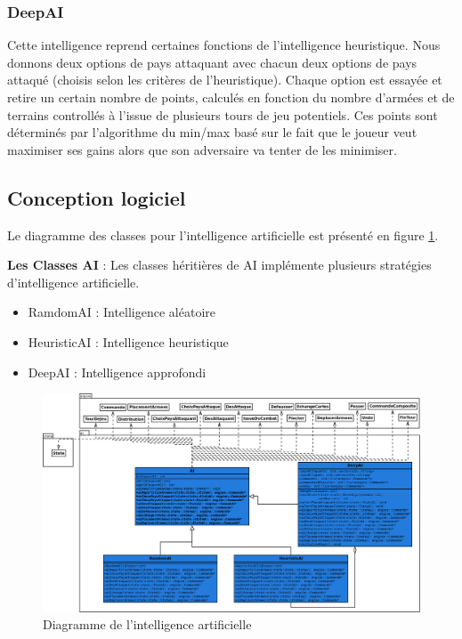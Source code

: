 \subsubsection{DeepAI}
Cette intelligence reprend certaines fonctions de l'intelligence heuristique. Nous donnons deux options de pays attaquant avec chacun deux options de pays attaqué (choisis selon les critères de l'heuristique). Chaque option est essayée et retire un certain nombre de points, calculés en fonction du nombre d'armées et de terrains controllés à l'issue de plusieurs tours de jeu potentiels. Ces points sont déterminés par l'algorithme du min/max basé sur le fait que le joueur veut maximiser ses gains alors que son adversaire va tenter de les minimiser. 

\newpage
\subsection{Conception logiciel}
Le diagramme des classes pour l’intelligence artificielle est présenté en figure \ref{fig:ai}.

\textbf{Les Classes AI} : Les classes héritières de AI implémente plusieurs stratégies d'intelligence artificielle.
\begin{itemize}
    \item RamdomAI : Intelligence aléatoire
    \item HeuristicAI : Intelligence heuristique
    \item DeepAI : Intelligence approfondi
\end{itemize}

\begin{landscape}
    \begin{figure}[!htbp]
        \centering
        \includegraphics[width=17cm]{Images/ai.png}
        \caption{Diagramme de l'intelligence artificielle}
        \label{fig:ai}
    \end{figure}
\end{landscape}

